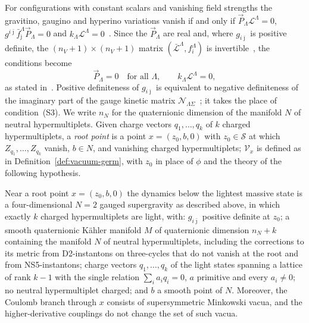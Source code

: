 For configurations with constant scalars and vanishing field strengths the gravitino, gaugino and
hyperino variations vanish if and only if $\vec P_\Lambda\mathcal L^\Lambda=0$,
$g^{i\bar\jmath}\bar f^\Lambda_{\bar\jmath}\vec P_\Lambda=0$ and $k_\Lambda\mathcal L^\Lambda=0$~\cite[Sects.~2.1--2.3,
2.4.2]{Hristov:2009}. Since the $\vec P_\Lambda$ are real and, where $g_{i\bar\jmath}$ is positive definite,
the $(n_V+1)\times(n_V+1)$ matrix $(\bar{\mathcal L}^\Lambda,f_i^\Lambda)$ is
invertible~\cite[Lemma~B.5, Cor.~B.6]{crapsetal1997specialgeometry}, the conditions become
\begin{equation}
 \vec P_\Lambda=0\quad\text{for all }\Lambda,\qquad k_\Lambda\mathcal L^\Lambda=0,
 \label{eq:vacua-4d}
\end{equation}
as stated in~\cite[Sect.~2.4.2]{Hristov:2009}. Positive definiteness of $g_{i\bar\jmath}$ is equivalent to
negative definiteness of the imaginary part of the gauge kinetic matrix
$\mathcal N_{\Lambda\Sigma}$~\cite[eq.~(4.45)]{crapsetal1997specialgeometry}; it takes the place of
condition~(S3). We write $n_N$ for the quaternionic dimension of the manifold $N$ of neutral hypermultiplets. Given charge
vectors $q_1,\dots,q_k$ of $k$ charged hypermultiplets, a \emph{root point} is a point $x=(z_0,b,0)$ with
$z_0\in\mathcal S$ at which $Z_{q_1},\dots,Z_{q_k}$ vanish, $b\in N$, and vanishing charged hypermultiplets;
$\mathcal V_x$ is defined as in Definition~\ref{def:vacuum-germ}, with $z_0$ in place of $\phi$ and the theory
of the following hypothesis.

\begin{hypothesis}\label{hyp:regular-4d}
Near a root point $x=(z_0,b,0)$ the dynamics below the lightest massive state is a four-dimensional $N=2$
gauged supergravity as described above, in which exactly $k$ charged hypermultiplets are light, with: $g_{i\bar\jmath}$ positive definite at
$z_0$; a smooth quaternionic K\"ahler manifold $M$ of quaternionic dimension $n_N+k$ containing the
manifold $N$ of neutral hypermultiplets, including the corrections to its metric from D2-instantons on
three-cycles that do not vanish at the root and from NS5-instantons; charge vectors
$q_1,\dots,q_k$ of the light states spanning a lattice of rank $k-1$ with the single relation
$\sum_ia_iq_i=0$, $a$ primitive and every $a_i\neq0$; no neutral hypermultiplet charged; and $b$ a smooth
point of $N$. Moreover, the Coulomb branch through $x$ consists of supersymmetric Minkowski vacua, and the
higher-derivative couplings do not change the set of such vacua.
\end{hypothesis}

